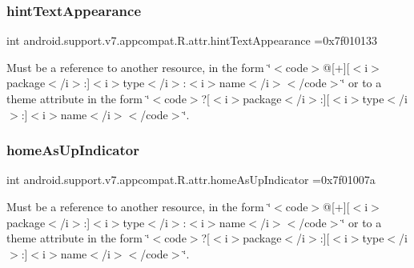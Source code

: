 \subsubsection{\texorpdfstring{hint\+Text\+Appearance}{hintTextAppearance}}
{\footnotesize\ttfamily int android.\+support.\+v7.\+appcompat.\+R.\+attr.\+hint\+Text\+Appearance =0x7f010133\hspace{0.3cm}{\ttfamily [static]}}

Must be a reference to another resource, in the form \char`\"{}$<$code$>$@\mbox{[}+\mbox{]}\mbox{[}$<$i$>$package$<$/i$>$\+:\mbox{]}$<$i$>$type$<$/i$>$\+:$<$i$>$name$<$/i$>$$<$/code$>$\char`\"{} or to a theme attribute in the form \char`\"{}$<$code$>$?\mbox{[}$<$i$>$package$<$/i$>$\+:\mbox{]}\mbox{[}$<$i$>$type$<$/i$>$\+:\mbox{]}$<$i$>$name$<$/i$>$$<$/code$>$\char`\"{}. \mbox{\label{classandroid_1_1support_1_1v7_1_1appcompat_1_1R_1_1attr_a2d0278177bbbefbfdf59fa9761e5b439}} 
\subsubsection{\texorpdfstring{home\+As\+Up\+Indicator}{homeAsUpIndicator}}
{\footnotesize\ttfamily int android.\+support.\+v7.\+appcompat.\+R.\+attr.\+home\+As\+Up\+Indicator =0x7f01007a\hspace{0.3cm}{\ttfamily [static]}}

Must be a reference to another resource, in the form \char`\"{}$<$code$>$@\mbox{[}+\mbox{]}\mbox{[}$<$i$>$package$<$/i$>$\+:\mbox{]}$<$i$>$type$<$/i$>$\+:$<$i$>$name$<$/i$>$$<$/code$>$\char`\"{} or to a theme attribute in the form \char`\"{}$<$code$>$?\mbox{[}$<$i$>$package$<$/i$>$\+:\mbox{]}\mbox{[}$<$i$>$type$<$/i$>$\+:\mbox{]}$<$i$>$name$<$/i$>$$<$/code$>$\char`\"{}. \mbox{\label{classandroid_1_1support_1_1v7_1_1appcompat_1_1R_1_1attr_a37c5ccbcfaf034e696f6cde6b0021747}} 
